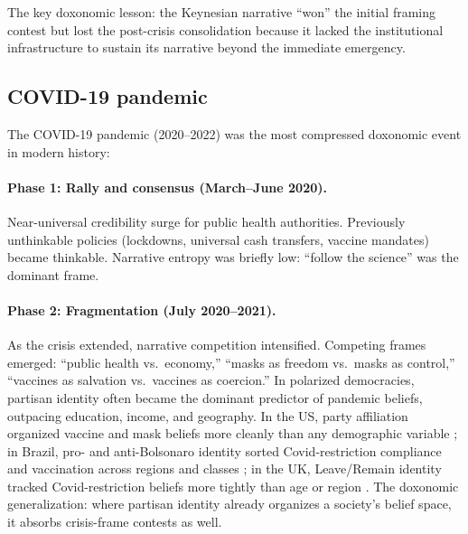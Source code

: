 The key doxonomic lesson: the Keynesian narrative ``won'' the initial framing contest but lost the post-crisis consolidation because it lacked the institutional infrastructure to sustain its narrative beyond the immediate emergency.

\subsection{COVID-19 pandemic}

\begin{example}
\label{ex:covid}
The COVID-19 pandemic (2020--2022) was the most compressed doxonomic event in modern history:

\paragraph{Phase 1: Rally and consensus (March--June 2020).}
Near-universal credibility surge for public health authorities.
Previously unthinkable policies (lockdowns, universal cash transfers, vaccine mandates) became thinkable.
Narrative entropy was briefly low: ``follow the science'' was the dominant frame.

\paragraph{Phase 2: Fragmentation (July 2020--2021).}
As the crisis extended, narrative competition intensified.
Competing frames emerged: ``public health vs.\ economy,'' ``masks as freedom vs.\ masks as control,'' ``vaccines as salvation vs.\ vaccines as coercion.''
In polarized democracies, partisan identity often became the dominant predictor of pandemic beliefs, outpacing education, income, and geography.
In the US, party affiliation organized vaccine and mask beliefs more cleanly than any demographic variable \autocite{druckman2021}; in Brazil, pro- and anti-Bolsonaro identity sorted Covid-restriction compliance and vaccination across regions and classes \autocite{ajzenman2020}; in the UK, Leave/Remain identity tracked Covid-restriction beliefs more tightly than age or region \autocite{roozenbeek2020}.
The doxonomic generalization: where partisan identity already organizes a society's belief space, it absorbs crisis-frame contests as well.


\end{example}
